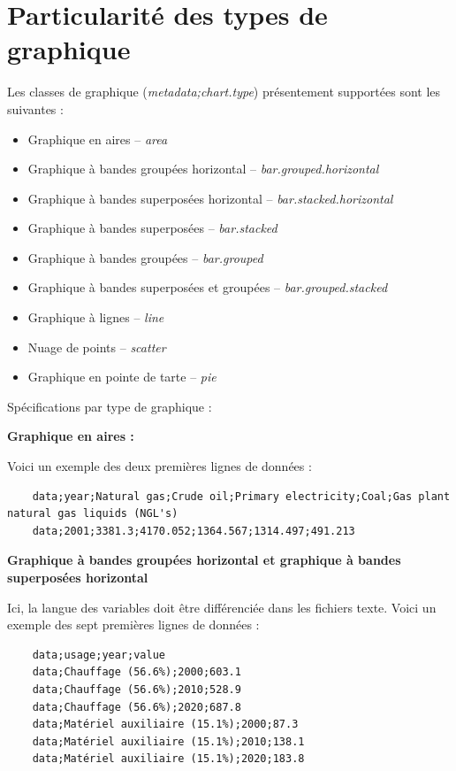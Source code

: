 \documentclass[11pt]{article}
\begin{document}
\pagebreak
\section{Particularité des types de graphique}

Les classes de graphique (\textit{metadata;chart.type}) présentement supportées sont les suivantes :
\begin{itemize}
    \item Graphique en aires -- \textit{area}
    \item Graphique à bandes groupées horizontal -- \textit{bar.grouped.horizontal}
    \item Graphique à bandes superposées horizontal -- \textit{bar.stacked.horizontal}
    \item Graphique à bandes superposées -- \textit{bar.stacked}
    \item Graphique à bandes groupées -- \textit{bar.grouped}
    \item Graphique à bandes superposées et groupées -- \textit{bar.grouped.stacked}
    \item Graphique à lignes -- \textit{line}
    \item Nuage de points -- \textit{scatter}
    \item Graphique en pointe de tarte -- \textit{pie}
\end{itemize}

Spécifications par type de graphique :

\textbf{Graphique en aires :}

Voici un exemple des deux premières lignes de données :
\begin{lstlisting}
    data;year;Natural gas;Crude oil;Primary electricity;Coal;Gas plant natural gas liquids (NGL's)
    data;2001;3381.3;4170.052;1364.567;1314.497;491.213
\end{lstlisting}

\textbf{Graphique à bandes groupées horizontal et graphique à bandes superposées horizontal}

Ici, la langue des variables doit être différenciée dans les fichiers texte. Voici un exemple des sept premières lignes de données :
\begin{lstlisting}
    data;usage;year;value
    data;Chauffage (56.6%);2000;603.1
    data;Chauffage (56.6%);2010;528.9
    data;Chauffage (56.6%);2020;687.8
    data;Matériel auxiliaire (15.1%);2000;87.3
    data;Matériel auxiliaire (15.1%);2010;138.1
    data;Matériel auxiliaire (15.1%);2020;183.8
\end{lstlisting}
\end{document}
